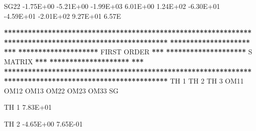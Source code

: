\documentclass[
  11pt,
  krantz2, a4paper, twoside]{krantz}
\newenvironment{Shaded}{\begin{snugshade}}{\end{snugshade}}
\newcommand{\DecValTok}[1]{\textcolor[rgb]{0.00,0.00,0.81}{#1}}
\newcommand{\ErrorTok}[1]{\textcolor[rgb]{0.64,0.00,0.00}{\textbf{#1}}}
\newcommand{\FloatTok}[1]{\textcolor[rgb]{0.00,0.00,0.81}{#1}}
\newcommand{\NormalTok}[1]{#1}
\newcommand{\OperatorTok}[1]{\textcolor[rgb]{0.81,0.36,0.00}{\textbf{#1}}}
\newcommand{\StringTok}[1]{\textcolor[rgb]{0.31,0.60,0.02}{#1}}
\theoremstyle{definition}
\theoremstyle{definition}
\theoremstyle{definition}
\theoremstyle{remark}
\begin{document}
\begin{Shaded}
\begin{Highlighting}[]
\NormalTok{SG22   }\FloatTok{{-}1.75E+00} \FloatTok{{-}5.21E+00} \FloatTok{{-}1.99E+03}  \FloatTok{6.01E+00}  \FloatTok{1.24E+02} \FloatTok{{-}6.30E+01} \FloatTok{{-}4.59E+01} \FloatTok{{-}2.01E+02}  \FloatTok{9.27E+01}  \FloatTok{6.57}\NormalTok{E}
                                                                                                       
                                                                                                       
\OperatorTok{**}\ErrorTok{*****************************************************************************************************}
\ErrorTok{********************}\StringTok{                                                                                }\ErrorTok{***}
\ErrorTok{********************}\StringTok{                                   }\NormalTok{FIRST ORDER                                  }\OperatorTok{**}\ErrorTok{*}
\ErrorTok{********************}\StringTok{                                     }\NormalTok{S MATRIX                                   }\OperatorTok{**}\ErrorTok{*}
\ErrorTok{********************}\StringTok{                                                                                }\ErrorTok{***}
\ErrorTok{*******************************************************************************************************}
\StringTok{                                                                                                       }
\StringTok{                                                                                                       }
\StringTok{           }\NormalTok{TH }\DecValTok{1}\NormalTok{      TH }\DecValTok{2}\NormalTok{      TH }\DecValTok{3}\NormalTok{      OM11      OM12      OM13      OM22      OM23      OM33      SG}
                                                                                                       
                                                                                                       
\NormalTok{TH }\DecValTok{1}    \FloatTok{7.83E+01}                                                                                       
                                                                                                       
\NormalTok{TH }\DecValTok{2}   \FloatTok{{-}4.65E+00}  \FloatTok{7.65E{-}01}                                                                             
                                                                                                       

\end{Highlighting}
\end{Shaded}
\end{document}

